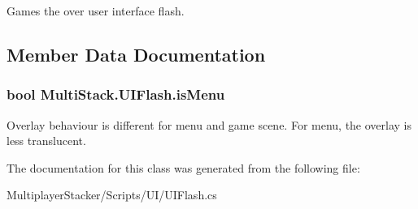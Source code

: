Games the over user interface flash. 



\subsection{Member Data Documentation}
\hypertarget{class_multi_stack_1_1_u_i_flash_a520d1f1f11407f2c7feb9d790c659854}{}
\subsubsection[{is\+Menu}]{\setlength{\rightskip}{0pt plus 5cm}bool Multi\+Stack.\+U\+I\+Flash.\+is\+Menu}\label{class_multi_stack_1_1_u_i_flash_a520d1f1f11407f2c7feb9d790c659854}


Overlay behaviour is different for menu and game scene. For menu, the overlay is less translucent. 



The documentation for this class was generated from the following file\+:\begin{DoxyCompactItemize}
\item 
Multiplayer\+Stacker/\+Scripts/\+U\+I/U\+I\+Flash.\+cs\end{DoxyCompactItemize}
